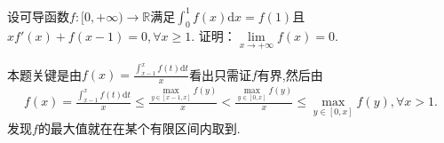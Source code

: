\documentclass[../../main.tex]{subfiles}
\begin{document}
\begin{example}
设可导函数$f:[0,+\infty)\to\mathbb{R}$满足$\int_0^1 f(x)\mathrm{d}x = f(1)$且 $x f'(x) + f(x - 1) = 0, \forall x \geqslant 1$. 证明：$\lim\limits_{x\to+\infty} f(x) = 0$.
\end{example}
\begin{note}
本题关键是由$f\left( x \right) =\frac{\int_{x-1}^x{f\left( t \right) \mathrm{d}t}}{x}$看出只需证$f$有界,然后由
\begin{align*}
f\left( x \right) =\frac{\int_{x-1}^x{f\left( t \right) \mathrm{d}t}}{x}\leqslant \frac{\underset{y\in \left[ x-1,x \right]}{\max}f\left( y \right)}{x}<\frac{\underset{y\in \left[ 0,x \right]}{\max}f\left( y \right)}{x}\leqslant \underset{y\in \left[ 0,x \right]}{\max}f\left( y \right) ,\forall x>1.
\end{align*}
发现$f$的最大值就在在某个有限区间内取到.
\end{note}
\end{document}
